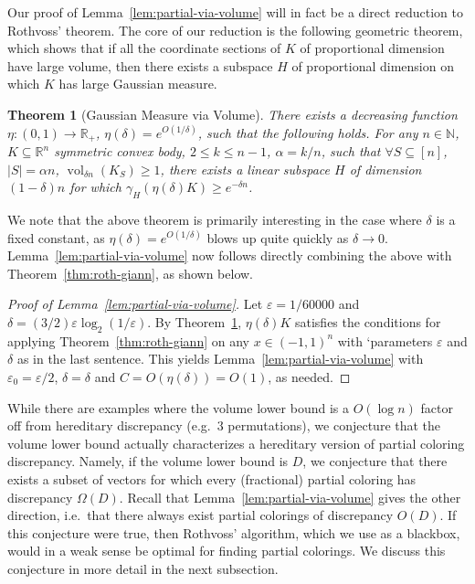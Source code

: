 \documentclass[11pt]{article}
\newtheorem{theorem}{Theorem}
\newcommand{\R}{{\mathbb{R}}}
\newcommand{\N}{{\mathbb{N}}}
\newcommand\eps{\varepsilon}
\DeclareMathOperator{\vol}{vol}
\begin{document}
Our proof of Lemma~\ref{lem:partial-via-volume} will in fact be a direct
reduction to Rothvoss' theorem. The core of our reduction is the following
geometric theorem, which shows that if all the coordinate sections of $K$ of
proportional dimension have large volume, then there exists a subspace $H$ of
proportional dimension on which $K$ has large Gaussian measure. 

\begin{theorem}[Gaussian Measure via Volume]
\label{thm:gauss-via-volume}
There exists a decreasing function $\eta: (0,1) \rightarrow \R_+$, $\eta(\delta)
= e^{O(1/\delta)}$, such that the following holds. For any $n \in \N$, $K
\subseteq \R^n$ symmetric convex body, $2 \leq k \leq n-1$, $\alpha = k/n$, such
that $\forall S \subseteq [n]$, $|S| = \alpha n$, $\vol_{\delta n}(K_S) \geq 1$,
there exists a linear subspace $H$ of dimension $(1-\delta)n$ for which
$\gamma_H(\eta(\delta) K) \geq e^{-\delta n}$.
\end{theorem}

We note that the above theorem is primarily interesting in the case where
$\delta$ is a fixed constant, as $\eta(\delta) = e^{O(1/\delta)}$ blows up quite
quickly as $\delta \rightarrow 0$. Lemma~\ref{lem:partial-via-volume} now
follows directly combining the above with Theorem~\ref{thm:roth-giann}, as shown
below.

\begin{proof}[Proof of Lemma~\ref{lem:partial-via-volume}] 
Let $\eps = 1/60000$ and $\delta = (3/2) \eps \log_2(1/\eps)$. By
Theorem~\ref{thm:gauss-via-volume}, $\eta(\delta) K$ satisfies the conditions
for applying Theorem~\ref{thm:roth-giann} on any $x \in (-1,1)^n$ with
`parameters $\eps$ and $\delta$ as in the last sentence. This yields
Lemma~\ref{lem:partial-via-volume} with $\eps_0 = \eps/2$, $\delta = \delta$ and
$C = O(\eta(\delta)) = O(1)$, as needed.   
\end{proof}

While there are examples where the volume lower bound is a $O(\log n)$ factor
off from hereditary discrepancy (e.g.~$3$ permutations), we conjecture that the
volume lower bound actually characterizes a hereditary version of partial
coloring discrepancy. Namely, if the volume lower bound is $D$, we conjecture
that there exists a subset of vectors for which every (fractional) partial coloring
has discrepancy $\Omega(D)$. Recall that Lemma~\ref{lem:partial-via-volume}
gives the other direction, i.e.~that there always exist partial colorings of
discrepancy $O(D)$. If this conjecture were true, then Rothvoss' algorithm,
which we use as a blackbox, would in a weak sense be optimal for finding
partial colorings. We discuss this conjecture in more detail in the next
subsection. 
\end{document}
